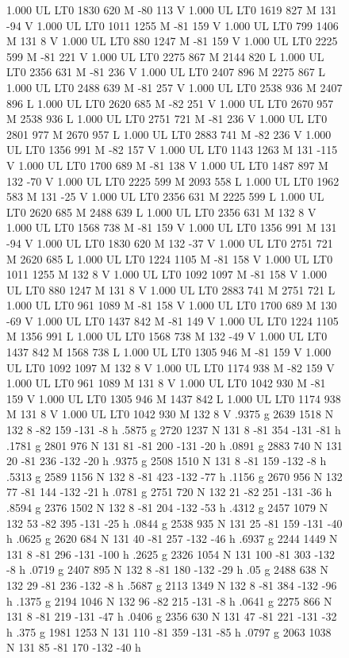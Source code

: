 \documentclass{LMCS}
\begin{document}
\begin{figure}[!tbp]
{{{1.000 UL
LT0
1830 620 M
-80 113 V
1.000 UL
LT0
1619 827 M
131 -94 V
1.000 UL
LT0
1011 1255 M
-81 159 V
1.000 UL
LT0
799 1406 M
131 8 V
1.000 UL
LT0
880 1247 M
-81 159 V
1.000 UL
LT0
2225 599 M
-81 221 V
1.000 UL
LT0
2275 867 M
2144 820 L
1.000 UL
LT0
2356 631 M
-81 236 V
1.000 UL
LT0
2407 896 M
2275 867 L
1.000 UL
LT0
2488 639 M
-81 257 V
1.000 UL
LT0
2538 936 M
2407 896 L
1.000 UL
LT0
2620 685 M
-82 251 V
1.000 UL
LT0
2670 957 M
2538 936 L
1.000 UL
LT0
2751 721 M
-81 236 V
1.000 UL
LT0
2801 977 M
2670 957 L
1.000 UL
LT0
2883 741 M
-82 236 V
1.000 UL
LT0
1356 991 M
-82 157 V
1.000 UL
LT0
1143 1263 M
131 -115 V
1.000 UL
LT0
1700 689 M
-81 138 V
1.000 UL
LT0
1487 897 M
132 -70 V
1.000 UL
LT0
2225 599 M
2093 558 L
1.000 UL
LT0
1962 583 M
131 -25 V
1.000 UL
LT0
2356 631 M
2225 599 L
1.000 UL
LT0
2620 685 M
2488 639 L
1.000 UL
LT0
2356 631 M
132 8 V
1.000 UL
LT0
1568 738 M
-81 159 V
1.000 UL
LT0
1356 991 M
131 -94 V
1.000 UL
LT0
1830 620 M
132 -37 V
1.000 UL
LT0
2751 721 M
2620 685 L
1.000 UL
LT0
1224 1105 M
-81 158 V
1.000 UL
LT0
1011 1255 M
132 8 V
1.000 UL
LT0
1092 1097 M
-81 158 V
1.000 UL
LT0
880 1247 M
131 8 V
1.000 UL
LT0
2883 741 M
2751 721 L
1.000 UL
LT0
961 1089 M
-81 158 V
1.000 UL
LT0
1700 689 M
130 -69 V
1.000 UL
LT0
1437 842 M
-81 149 V
1.000 UL
LT0
1224 1105 M
1356 991 L
1.000 UL
LT0
1568 738 M
132 -49 V
1.000 UL
LT0
1437 842 M
1568 738 L
1.000 UL
LT0
1305 946 M
-81 159 V
1.000 UL
LT0
1092 1097 M
132 8 V
1.000 UL
LT0
1174 938 M
-82 159 V
1.000 UL
LT0
961 1089 M
131 8 V
1.000 UL
LT0
1042 930 M
-81 159 V
1.000 UL
LT0
1305 946 M
1437 842 L
1.000 UL
LT0
1174 938 M
131 8 V
1.000 UL
LT0
1042 930 M
132 8 V
.9375 g 2639 1518 N 132 8 -82 159 -131 -8 h
.5875 g 2720 1237 N 131 8 -81 354 -131 -81 h
.1781 g 2801 976 N 131 81 -81 200 -131 -20 h
.0891 g 2883 740 N 131 20 -81 236 -132 -20 h
.9375 g 2508 1510 N 131 8 -81 159 -132 -8 h
.5313 g 2589 1156 N 132 8 -81 423 -132 -77 h
.1156 g 2670 956 N 132 77 -81 144 -132 -21 h
.0781 g 2751 720 N 132 21 -82 251 -131 -36 h
.8594 g 2376 1502 N 132 8 -81 204 -132 -53 h
.4312 g 2457 1079 N 132 53 -82 395 -131 -25 h
.0844 g 2538 935 N 131 25 -81 159 -131 -40 h
.0625 g 2620 684 N 131 40 -81 257 -132 -46 h
.6937 g 2244 1449 N 131 8 -81 296 -131 -100 h
.2625 g 2326 1054 N 131 100 -81 303 -132 -8 h
.0719 g 2407 895 N 132 8 -81 180 -132 -29 h
.05 g 2488 638 N 132 29 -81 236 -132 -8 h
.5687 g 2113 1349 N 132 8 -81 384 -132 -96 h
.1375 g 2194 1046 N 132 96 -82 215 -131 -8 h
.0641 g 2275 866 N 131 8 -81 219 -131 -47 h
.0406 g 2356 630 N 131 47 -81 221 -131 -32 h
.375 g 1981 1253 N 131 110 -81 359 -131 -85 h
.0797 g 2063 1038 N 131 85 -81 170 -132 -40 h
}}}
\end{figure}
\end{document}
